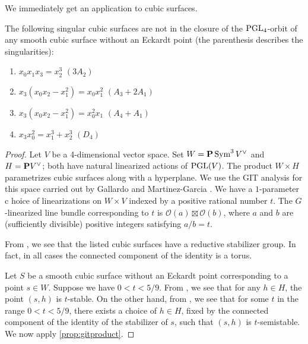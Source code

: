 \documentclass[12pt,reqno]{amsart}
\numberwithin{equation}{section}
\renewcommand{\O}{\mathcal O}
\begin{document}
We immediately get an application to cubic surfaces.
\begin{proposition}\label{prop:isogood}
  The following singular cubic surfaces are not in the closure of the $\PGL_4$-orbit of any smooth cubic surface without an Eckardt point (the parenthesis describes the singularities):
  \begin{enumerate}
  \item $x_0x_1x_3 = x_2^3$ \quad $(3A_2)$
  \item $x_3(x_0x_2-x_1^2) = x_0x_1^2$ \quad $(A_3 + 2A_1)$
  \item $x_3(x_0x_2-x_1^2) = x_0^2x_1$ \quad $(A_4 + A_1)$
  \item $x_3x_0^2 = x_1^3 + x_2^3$ \quad $(D_4)$
  \end{enumerate}
\end{proposition}
\begin{proof}
  Let $V$ be a 4-dimensional vector space.
  Set $W = \P \Sym^3 V^\vee$ and $H = \P V^\vee$; both have natural linearized actions of $\PGL(V)$.
  The product $W \times H$ parametrizes cubic surfaces along with a hyperplane.
  We use the GIT analysis for this space carried out by Gallardo and Martinez-Garcia \cite{gal.mar:19}.
  We have a $1$-parameter c hoice of linearizations on $W \times V$ indexed by a positive rational number $t$.
  The $G$-linearized line bundle corresponding to $t$ is $\O(a) \boxtimes \O(b)$, where $a$ and $b$ are (sufficiently divisible) positive integers satisfying $a/b = t$.

  From \cite[Theorem~3]{sak:10}, we see that the listed cubic surfaces have a reductive stabilizer group.
  In fact, in all cases the connected component of the identity is a torus.

  Let $S$ be a smooth cubic surface without an Eckardt point corresponding to a point $s \in W$.
  Suppose we have $0 < t < 5/9$.
  From \cite[Theorem~2]{gal.mar:19}, we see  that for any $h \in H$, the point $(s,h)$ is $t$-stable.
  On the other hand, from \cite[Table 2]{gal.mar:19}, we see that for some $t$ in the range $0 < t < 5/9$, there exists a choice of $h \in H$, fixed by the connected component of the identity of the stabilizer of $s$, such that $(s,h)$ is $t$-semistable.
  We now apply \autoref{prop:gitproduct}.


\end{proof}
\end{document}
